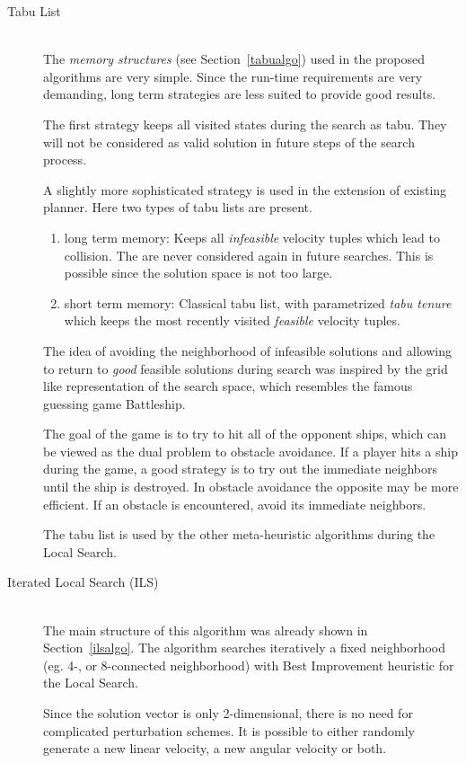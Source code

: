 \begin{description}
\item[Tabu List]\hfill \\
The \emph{memory structures} (see Section~\ref{tabualgo}) used in the proposed algorithms are very simple. 
Since the run-time requirements are very demanding, long term strategies are less suited to provide good results.

The first strategy keeps all visited states during the search as tabu. They will not be considered as valid solution in future steps of the search process. 

A slightly more sophisticated strategy is used in the extension of existing planner.
Here two types of tabu lists are present.
\begin{enumerate}
\item{long term memory:} Keeps all \emph{infeasible} velocity tuples which lead to collision. The are never considered again in future searches. This is possible since the solution space is not too large.
\item{short term memory:} Classical tabu list, with parametrized \emph{tabu tenure} which keeps the most recently visited \emph{feasible} velocity tuples.
\end{enumerate}

The idea of avoiding the neighborhood of infeasible solutions and allowing to return to \emph{good} feasible solutions during search was inspired by the grid like representation of the search space, which resembles the famous guessing game Battleship. 

The goal of the game is to try to hit all of the opponent ships, which can be viewed as the dual problem to obstacle avoidance. 
If a player hits a ship during the game, a good strategy is to try out the immediate neighbors until the ship is destroyed. 
In obstacle avoidance the opposite may be more efficient. If an obstacle is encountered, avoid its immediate neighbors.

The tabu list is used by the other meta-heuristic algorithms during the Local Search.
\item[Iterated Local Search (ILS)]\hfill \\
The main structure of this algorithm was already shown in Section~\ref{ilsalgo}.
The algorithm searches iteratively a fixed neighborhood (eg. 4-, or 8-connected neighborhood) with Best Improvement heuristic for the Local Search.

Since the solution vector is only 2-dimensional, there is no need for complicated perturbation schemes. 
It is possible to either randomly generate a new linear velocity, a new angular velocity or both. 


\end{description}
